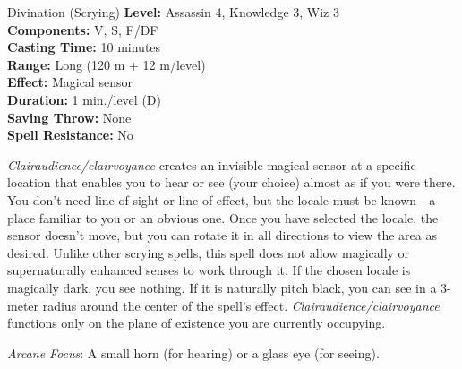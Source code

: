 {Divination (Scrying)}
{
	\textbf{Level:}
	Assassin 4, Knowledge 3, Wiz 3\\
	\textbf{Components:}
	V, S, F/DF\\
	\textbf{Casting Time:}
	10 minutes\\
	\textbf{Range:}
	Long (120 m + 12 m/level)\\
	\textbf{Effect:}
	Magical sensor\\
	\textbf{Duration:}
	1 min./level (D)\\
	\textbf{Saving Throw:}
	None\\
	\textbf{Spell Resistance:}
	No\\
}
{
	\emph{Clairaudience/clairvoyance} creates an invisible magical sensor at a specific location that enables you to hear or see (your choice) almost as if you were there. You don't need line of sight or line of effect, but the locale must be known---a place familiar to you or an obvious one. Once you have selected the locale, the sensor doesn't move, but you can rotate it in all directions to view the area as desired. Unlike other scrying spells, this spell does not allow magically or supernaturally enhanced senses to work through it. If the chosen locale is magically dark, you see nothing. If it is naturally pitch black, you can see in a 3-meter radius around the center of the spell's effect. \emph{Clairaudience/clairvoyance} functions only on the plane of existence you are currently occupying.

	\textit{Arcane Focus}:
	A small horn (for hearing) or a glass eye (for seeing).

}
